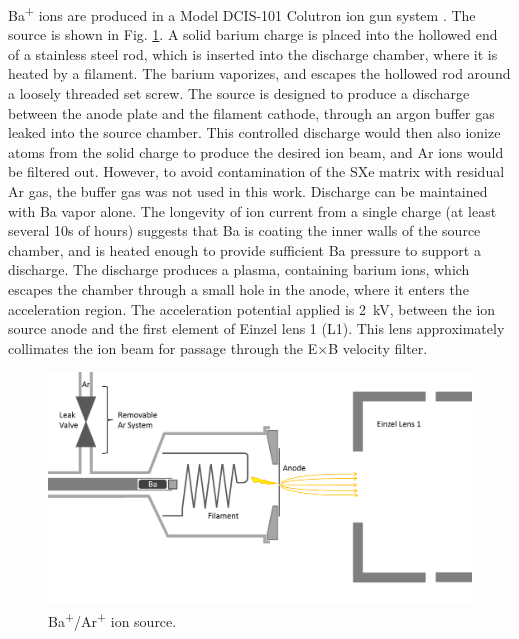 Ba\textsuperscript{+} ions are produced in a Model DCIS-101 Colutron ion gun system \cite{Colutron}.  The source is shown in Fig. \ref{fig:ionsource}.  A solid barium charge is placed into the hollowed end of a stainless steel rod, which is inserted into the discharge chamber, where it is heated by a filament.  The barium vaporizes, and escapes the hollowed rod around a loosely threaded set screw.  The source is designed to produce a discharge between the anode plate and the filament cathode, through an argon buffer gas leaked into the source chamber.  This controlled discharge would then also ionize atoms from the solid charge to produce the desired ion beam, and Ar ions would be filtered out.  However, to avoid contamination of the SXe matrix with residual Ar gas, the buffer gas was not used in this work.  Discharge can be maintained with Ba vapor alone.  The longevity of ion current from a single charge (at least several 10s of hours) suggests that Ba is coating the inner walls of the source chamber, and is heated enough to provide sufficient Ba pressure to support a discharge.  The discharge produces a plasma, containing barium ions, which escapes the chamber through a small hole in the anode, where it enters the acceleration region.  The acceleration potential applied is 2~kV, between the ion source anode and the first element of Einzel lens 1 (L1).  This lens approximately collimates the ion beam for passage through the E$\times$B velocity filter.


\begin{figure} %
        \centering
                \includegraphics[width=.95\textwidth]{figures/ionSource.png}
                \caption{Ba\textsuperscript{+}/Ar\textsuperscript{+} ion source.}
\label{fig:ionsource}
\end{figure}

